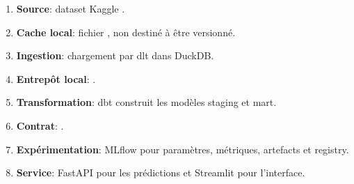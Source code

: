\begin{enumerate}
    \item \textbf{Source}: dataset Kaggle .
    \item \textbf{Cache local}: fichier , non destiné à être versionné.
    \item \textbf{Ingestion}: chargement par dlt dans DuckDB.
    \item \textbf{Entrepôt local}: .
    \item \textbf{Transformation}: dbt construit les modèles staging et mart.
    \item \textbf{Contrat}: .
    \item \textbf{Expérimentation}: MLflow pour paramètres, métriques, artefacts et registry.
    \item \textbf{Service}: FastAPI pour les prédictions et Streamlit pour l'interface.
\end{enumerate}
